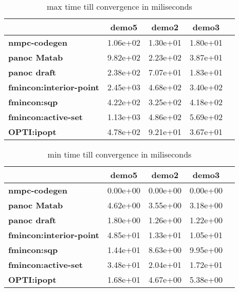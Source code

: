 \begin{table}[H]
	\centering
	\begin{tabular}{|l|c|c|c|c|}
		\hline
		&\textbf{demo5}&\textbf{demo2}&\textbf{demo3}\\\hline
		\textbf{nmpc-codegen}&1.06e+02&1.30e+01&1.80e+01\\\hline
		\textbf{panoc Matab}&9.82e+02&2.23e+02&3.87e+01\\\hline
		\textbf{panoc draft}&2.38e+02&7.07e+01&1.83e+01\\\hline
		\textbf{fmincon:interior-point}&2.45e+03&4.68e+02&3.40e+02\\\hline
		\textbf{fmincon:sqp}&4.22e+02&3.25e+02&4.18e+02\\\hline
		\textbf{fmincon:active-set}&1.13e+03&4.86e+02&5.69e+02\\\hline
		\textbf{OPTI:ipopt}&4.78e+02&9.21e+01&3.67e+01\\\hline
	\end{tabular}
	\caption{max time till convergence in miliseconds}
	\label{tbl:max time till convergence with noise}
\end{table}

\begin{table}[H]
	\centering
	\begin{tabular}{|l|	c|c|c|c|}
		\hline
		&\textbf{demo5}&\textbf{demo2}&\textbf{demo3}\\\hline
		\textbf{nmpc-codegen}&0.00e+00&0.00e+00&0.00e+00\\\hline
		\textbf{panoc Matab}&4.62e+00&3.55e+00&3.18e+00\\\hline
		\textbf{panoc draft}&1.80e+00&1.26e+00&1.22e+00\\\hline
		\textbf{fmincon:interior-point}&4.85e+01&1.33e+01&1.05e+01\\\hline
		\textbf{fmincon:sqp}&1.44e+01&8.63e+00&9.95e+00\\\hline
		\textbf{fmincon:active-set}&3.48e+01&2.04e+01&1.72e+01\\\hline
		\textbf{OPTI:ipopt}&1.68e+01&4.67e+00&5.38e+00\\\hline
	\end{tabular}
	\caption{min time till convergence in miliseconds}
	\label{tbl:min time till convergence with noise}
\end{table}